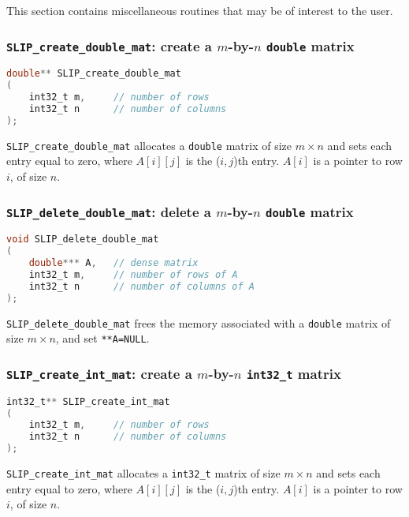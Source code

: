 \documentclass[12pt]{article}
\theoremstyle{definition}
\begin{document}
This section contains miscellaneous routines that may be of interest to the user.


\cprotect\subsubsection{\verb|SLIP_create_double_mat|: create a $m$-by-$n$ \verb|double| matrix} \label{ss:create_double_mat}

\begin{lstlisting}[language=C,frame=single]
double** SLIP_create_double_mat
(
    int32_t m,     // number of rows
    int32_t n      // number of columns
);
\end{lstlisting}


\verb|SLIP_create_double_mat| allocates a \verb|double| matrix of size $m \times n$ and sets each entry equal to zero, where $A[i][j]$ is the ($i,j$)th entry. $A[i]$ is a pointer to row $i$, of size $n$.

\cprotect\subsubsection{\verb|SLIP_delete_double_mat|: delete a $m$-by-$n$ \verb|double| matrix}


\begin{lstlisting}[language=C,frame=single]
void SLIP_delete_double_mat
(
    double*** A,   // dense matrix
    int32_t m,     // number of rows of A
    int32_t n      // number of columns of A
);
\end{lstlisting}

\verb|SLIP_delete_double_mat| frees the memory associated with a \verb|double| matrix of size $m \times n$, and set \verb|**A=NULL|.


\cprotect\subsubsection{\verb|SLIP_create_int_mat|: create a $m$-by-$n$ \verb|int32_t| matrix}


\begin{lstlisting}[language=C,frame=single]
int32_t** SLIP_create_int_mat
(
    int32_t m,     // number of rows
    int32_t n      // number of columns
);
\end{lstlisting}

\verb|SLIP_create_int_mat| allocates a \verb|int32_t| matrix of size $m \times n$ and sets each entry equal to zero, where $A[i][j]$ is the ($i,j$)th entry. $A[i]$ is a pointer to row $i$, of size $n$.
\end{document}
